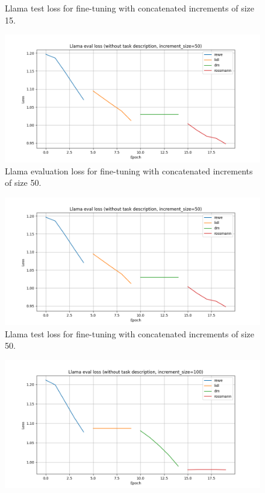 \documentclass[licencjacka,en]{pracamgr}
\begin{document}
\begin{appendices}
\begin{figure}[h]
    \caption{Llama test loss for fine-tuning with concatenated increments of size 15.}
    \label{fig:llama-inc-tot-15-test}
\end{figure}
\begin{figure}[h]
    \centering
    \includegraphics[width=0.8\linewidth]{bachelor_images/llama_ft/llama-inc-50-tot-eval.png}
    \caption{Llama evaluation loss for fine-tuning with concatenated increments of size 50.}
    \label{fig:llama-inc-tot-50-eval}
\end{figure}
\begin{figure}[h]
    \centering
    \includegraphics[width=0.8\linewidth]{bachelor_images/llama_ft/llama-inc-50-tot-eval.png}
    \caption{Llama test loss for fine-tuning with concatenated increments of size 50.}
    \label{fig:llama-inc-tot-50-test}
\end{figure}
\begin{figure}[h]
    \centering
    \includegraphics[width=0.8\linewidth]{bachelor_images/llama_ft/llama-inc-100-tot-eval.png}

\end{figure}
\end{appendices}
\end{document}
